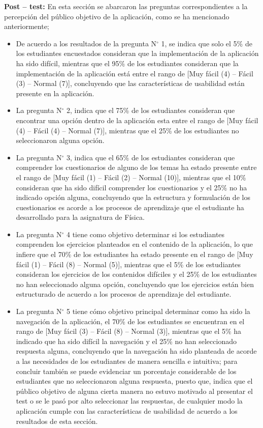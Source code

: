 \textbf{Post – test:} En esta sección se abarcaron las preguntas correspondientes a la percepción del público objetivo de la aplicación, como se ha mencionado anteriormente; 
\begin{itemize}

\item  De acuerdo a los resultados de la pregunta N$^{\circ}$  1, se indica que solo el 5\% de los estudiantes encuestados consideran que la implementación de la aplicación ha sido difícil, mientras que el 95\% de los estudiantes consideran que la implementación de la aplicación está entre el rango de [Muy fácil (4) – Fácil (3) – Normal (7)], concluyendo que las características de usabilidad están presente en la aplicación. 

\item La pregunta N$^{\circ}$ 2, indica que el 75\% de los estudiantes consideran que encontrar una opción dentro de la aplicación esta entre el rango de [Muy fácil (4) – Fácil (4) – Normal (7)], mientras que el 25\% de los estudiantes no seleccionaron alguna opción. 

\item La pregunta N$^{\circ}$ 3, indica que el 65\% de los estudiantes consideran que comprender los cuestionarios de alguno de los temas ha estado presente entre el rango de [Muy fácil (1) – Fácil (2) – Normal (10)], mientras que el 10\% consideran que ha sido difícil comprender los cuestionarios y el 25\% no ha indicado opción alguna, concluyendo que la estructura y formulación de los cuestionarios es acorde a los procesos de aprendizaje que el estudiante ha desarrollado para la asignatura de Física. 

\item La pregunta N$^{\circ}$ 4 tiene como objetivo determinar si los estudiantes comprenden los ejercicios planteados en el contenido de la aplicación, lo que infiere que el 70\% de los estudiantes ha estado presente en el rango de [Muy fácil (1) – Fácil (8) – Normal (5)], mientras que el 5\% de los estudiantes consideran los ejercicios de los contenidos difíciles y el 25\% de los estudiantes no han seleccionado alguna opción, concluyendo que los ejercicios están bien estructurado de acuerdo a los procesos de aprendizaje del estudiante. 

\item La pregunta N$^{\circ}$ 5 tiene cómo objetivo principal determinar como ha sido la navegación de la aplicación, el 70\% de los estudiantes se encuentran en el rango de [Muy fácil (3) – Fácil (8) – Normal (3)], mientras que el 5\% ha indicado que ha sido difícil la navegación y el 25\% no han seleccionado respuesta alguna, concluyendo que la navegación ha sido planteada de acorde a las necesidades de los estudiantes de manera sencilla e intuitiva; para concluir también se puede evidenciar un porcentaje considerable de los estudiantes que no seleccionaron alguna respuesta, puesto que, indica que el público objetivo de alguna cierta manera no estuvo motivado al presentar el test o se le pasó por alto seleccionar las respuestas, de cualquier modo la aplicación cumple con las características de usabilidad de acuerdo a los resultados de esta sección.

\end{itemize}

